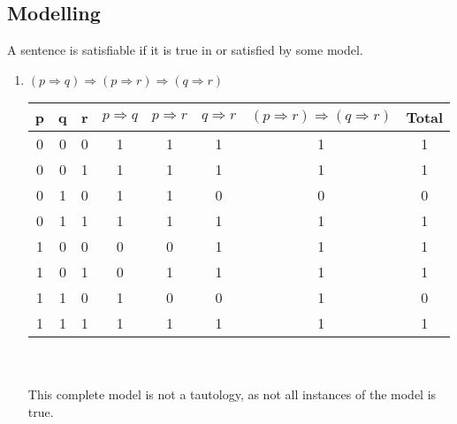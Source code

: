 \subsection{Modelling}
\begin{large}
  A sentence is satisfiable if it is true in or satisfied by some model.

  \begin{enumerate}[label= (\alph*)]
    \item $ (p \Rightarrow q) \Rightarrow (p \Rightarrow r) \Rightarrow ( q \Rightarrow r ) $

          \begin{tabular}{c|c|c|c|c|c|c||c}
            p & q & r & $ p \Rightarrow q $ & $ p \Rightarrow r $ & $ q \Rightarrow r $ & $ (p \Rightarrow r) \Rightarrow ( q \Rightarrow r ) $ & Total \\
            \hline \hline
            0 & 0 & 0 & 1                   & 1                   & 1                   & 1                                                     & 1     \\
            \hline
            0 & 0 & 1 & 1                   & 1                   & 1                   & 1                                                     & 1     \\
            \hline
            0 & 1 & 0 & 1                   & 1                   & 0                   & 0                                                     & 0     \\
            \hline
            0 & 1 & 1 & 1                   & 1                   & 1                   & 1                                                     & 1     \\
            \hline
            1 & 0 & 0 & 0                   & 0                   & 1                   & 1                                                     & 1     \\
            \hline
            1 & 0 & 1 & 0                   & 1                   & 1                   & 1                                                     & 1     \\
            \hline
            1 & 1 & 0 & 1                   & 0                   & 0                   & 1                                                     & 0     \\
            \hline
            1 & 1 & 1 & 1                   & 1                   & 1                   & 1                                                     & 1     \\
            \hline
          \end{tabular}
          \\ \\
          This complete model is not a tautology, as not all instances of the model is true.


\end{enumerate}
\end{large}
